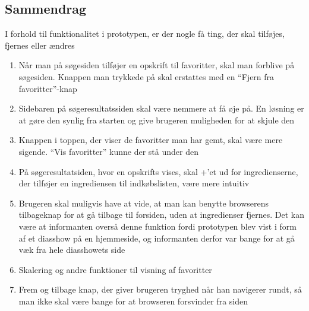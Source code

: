 \subsection{Sammendrag}

I forhold til funktionalitet i prototypen, er der nogle få ting, der skal tilføjes, fjernes eller ændres

\begin{enumerate}[noitemsep]
\item Når man på søgesiden tilføjer en opskrift til favoritter, skal man forblive på søgesiden. Knappen man trykkede på skal erstattes med en ``Fjern fra favoritter''-knap
\item Sidebaren på søgeresultatssiden skal være nemmere at få øje på. En løsning er at gøre den synlig fra starten og give brugeren muligheden for at skjule den
\item Knappen i toppen, der viser de favoritter man har gemt, skal være mere sigende. ``Vis favoritter'' kunne der stå under den
\item På søgeresultatsiden, hvor en opskrifts vises, skal +’et ud for ingredienserne, der tilføjer en ingrediensen til indkøbslisten, være mere intuitiv
\item Brugeren skal muligvis have at vide, at man kan benytte browserens tilbageknap for at gå tilbage til forsiden, uden at ingredienser fjernes. Det kan være at informanten overså denne funktion fordi prototypen blev vist i form af et diasshow på en hjemmeside, og informanten derfor var bange for at gå væk fra hele diasshowets side
\item Skalering og andre funktioner til visning af favoritter
\item Frem og tilbage knap, der giver brugeren tryghed når han navigerer rundt, så man ikke skal være bange for at browseren forsvinder fra siden
\end{enumerate}
